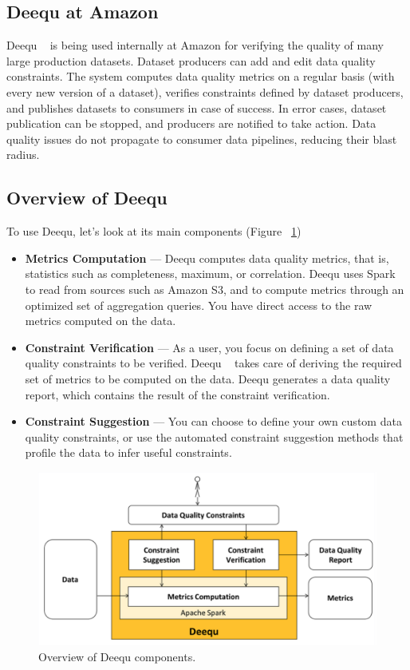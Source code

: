 \subsection{Deequ at Amazon}

Deequ ~\cite{Schelter:2018:ALD:3229863.3275547} is being used internally at Amazon for verifying the quality of many large production datasets. Dataset producers can add and edit data quality constraints. The system computes data quality metrics on a regular basis (with every new version of a dataset), verifies constraints defined by dataset producers, and publishes datasets to consumers in case of success. In error cases, dataset publication can be stopped, and producers are notified to take action. Data quality issues do not propagate to consumer data pipelines, reducing their blast radius.
\subsection{Overview of Deequ}

To use Deequ, let's look at its main components (Figure ~\ref{fig:deeaqu})

\begin{itemize}
	\item {
		\textbf{Metrics Computation} — Deequ computes data quality metrics, that is, statistics such as completeness, maximum, or correlation. Deequ uses Spark to read from sources such as Amazon S3, and to compute metrics through an optimized set of aggregation queries. You have direct access to the raw metrics computed on the data.
	}
\item {
	\textbf{Constraint Verification} — As a user, you focus on defining a set of data quality constraints to be verified. Deequ ~\cite{Schelter:2018:ALD:3229863.3275547} takes care of deriving the required set of metrics to be computed on the data. Deequ generates a data quality report, which contains the result of the constraint verification.
}
\item {
	\textbf{Constraint Suggestion} — You can choose to define your own custom data quality constraints, or use the automated constraint suggestion methods that profile the data to infer useful constraints.
}
\end{itemize}

\begin{figure}[H]
	\centering
	\includegraphics[scale=.4]{deeaqu}
	\caption{Overview of Deequ components.}
	\label{fig:deeaqu}
\end{figure}






